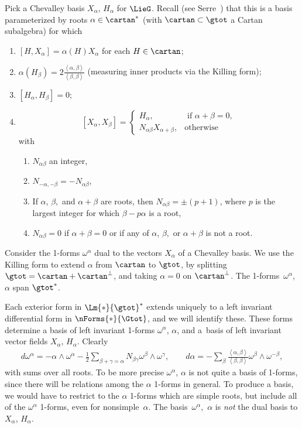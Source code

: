 Pick a Chevalley basis $X_{\alpha}$, $H_{\alpha}$
for $\LieG$. Recall (see Serre~\cite{Serre:2001}) that this is a basis
parameterized by roots $\alpha \in \cartan^*$
(with $\cartan \subset \gtot$ a Cartan
subalgebra) for which
\begin{enumerate}\itemsep=0pt
\item $\left[H,X_{\alpha}\right]=\alpha(H) X_{\alpha}$
for each $H \in \cartan$;
\item $\alpha\left(H_{\beta}\right)=
2 \frac{\left<\alpha, \beta\right>}{\left<\beta,\beta\right>}$
(measuring inner products via the Killing form);
\item $\left[H_{\alpha},H_{\beta}\right]=0$;
\item
\[
\left[X_{\alpha},X_{\beta}\right]=
\begin{cases}
H_{\alpha}, & \text{ if } \alpha+\beta=0, \\
N_{\alpha\beta} X_{\alpha+\beta}, & \text{otherwise}
\end{cases}
\]
with
\begin{enumerate}\itemsep=0pt
\item $N_{\alpha\beta}$ an integer,
\item $N_{-\alpha,-\beta}=-N_{\alpha\beta}$,
\item If $\alpha$, $\beta, $ and $\alpha+\beta$ are roots, then
$N_{\alpha\beta}=\pm (p+1)$,
where $p$ is the largest integer for which $\beta-p  \alpha$ is a root,
\item
$N_{\alpha \beta}=0$ if $\alpha+\beta = 0$ or
if any of $\alpha$, $\beta,$ or  $\alpha+\beta$ is not a root.
\end{enumerate}
\end{enumerate}

Consider the 1-forms $\omega^{\alpha}$ dual to the vectors
$X_{\alpha}$ of a Chevalley basis. We use the Killing form to extend $\alpha$ from $\cartan$ to $\gtot$,
by splitting $\gtot = \cartan + \cartan^{\perp}$,
and taking $\alpha=0$ on $\cartan^{\perp}$. The 1-forms~$\omega^{\alpha}$,~$\alpha$
span $\gtot^*$.

Each exterior form in $\Lm{*}{\gtot}^*$ extends uniquely to
a left invariant dif\/ferential form in $\nForms{*}{\Gtot}$, and we will
identify these. These forms determine a basis of left invariant 1-forms
$\omega^{\alpha}$, $\alpha$, and a~basis of left invariant vector
f\/ields $X_{\alpha}$, $H_{\alpha}$. Clearly
\begin{gather*}
d \omega^{\alpha}  = - \alpha \wedge \omega^{\alpha} - \frac{1}{2}
\sum_{\beta + \gamma=\alpha} N_{\beta \gamma} \omega^{\beta} \wedge \omega^{\gamma}, \qquad
d \alpha  =
-
\sum_{\beta} \frac{\left<\alpha,\beta\right>}
{\left<\beta,\beta\right>} \omega^{\beta} \wedge \omega^{-\beta},
\end{gather*}
with sums over all roots.
To be more precise $\omega^{\alpha}$, $\alpha$ is not quite a basis of 1-forms,
since there will be relations among the $\alpha$ 1-forms
in general. To produce a basis, we would have to restrict
to the $\alpha$ 1-forms which are simple roots, but
include all of the $\omega^{\alpha}$ 1-forms,
even for nonsimple~$\alpha$. The basis~$\omega^{\alpha}$,~$\alpha$
is \emph{not} the dual basis to $X_{\alpha}$, $H_{\alpha}$.

